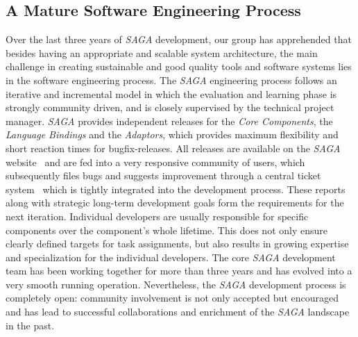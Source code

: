\documentclass[a4paper,10pt]{article}
\newcommand{\I}[1]{\textit{#1}}
\newcommand{\sagaimpl}{\textit{SAGA}\xspace}
\newcommand{\impl}{\sagaimpl}
\begin{document}
\vspace{-0.8em}


\subsection*{A Mature Software Engineering Process\label{engineering}}
\vspace{-0.6em}

 Over the last three years of \impl development, our group has apprehended 
 that besides having an appropriate and scalable system architecture, the main challenge in
 creating sustainable and good quality tools and software systems lies 
 in the software engineering process. The \impl engineering process follows an iterative and incremental
 model in which the evaluation and learning phase is strongly
 community driven, and is closely supervised by the technical project
 manager.  \impl provides independent releases for the \I{Core
 Components}, the \I{Language Bindings} and the \I{Adaptors}, which
 provides maximum flexibility and short reaction times for
 bugfix-releases. All releases are available on the \impl
 website~\cite{saga_downloads_web} and are fed into a very responsive
 community of users, which subsequently files bugs and suggests
 improvement through a central ticket
 system~\cite{saga_bugtracking_web} which is tightly integrated into
 the development process. These reports along with strategic long-term
 development goals form the requirements for the next iteration.
 Individual developers are usually responsible for specific components
 over the component's whole lifetime. This does not only ensure
 clearly defined targets for task assignments, but also results in
 growing expertise and specialization for the individual developers.
 The core \impl development team has been working together for more
 than three years and has evolved into a very smooth running
 operation.  Nevertheless, the \impl development process is completely
 open: community involvement is not only accepted but encouraged and
 has lead to successful collaborations and enrichment of the \impl
 landscape in the past.
\end{document}
